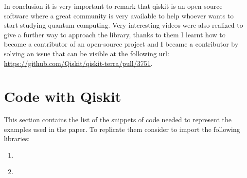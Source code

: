 \documentclass[english]{article}
\begin{document}
\begin{appendices}
			In conclusion it is very important to remark that qiskit is an open source software where a great community is very available to help whoever wants to start studying quantum computing. Very interesting videos were also realized to give a further way to approach the library, thanks to them I learnt how to become a contributor of an open-source project and I became a contributor by solving an issue that can be visible at the following url: \url{https://github.com/Qiskit/qiskit-terra/pull/3751}.
		
		\section{Code with Qiskit}
		This section contains the list of the snippets of code needed to represent the examples used in the paper. To replicate them consider to import the following libraries:
		
		
		\label{sec:codeWithQiskit}
			\begin{enumerate}
				\item \label{c:example3} 
				
				\item \label{c:example6} 
			\end{enumerate}
	\end{appendices}
	
	\clearpage
	
	\nocite{*}
	
\end{document}
